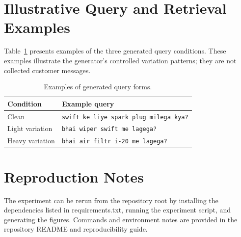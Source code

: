 \section{Illustrative Query and Retrieval Examples}
\label{app:examples}

Table~\ref{tab:sample-queries} presents examples of the three generated query conditions. These examples illustrate the generator's controlled variation patterns; they are not collected customer messages.

\begin{table}[htbp]
\centering
\small
\caption{Examples of generated query forms.}
\label{tab:sample-queries}
\begin{tabularx}{\linewidth}{lX}
\toprule
\textbf{Condition} & \textbf{Example query} \\
\midrule
Clean & \texttt{swift ke liye spark plug milega kya?} \\
Light variation & \texttt{bhai wiper swift me lagega?} \\
Heavy variation & \texttt{bhai air filtr i-20 me lagega?} \\
\bottomrule
\end{tabularx}
\end{table}

\section{Reproduction Notes}
The experiment can be rerun from the repository root by installing the dependencies listed in requirements.txt, running the experiment script, and generating the figures. Commands and environment notes are provided in the repository README and reproducibility guide.

